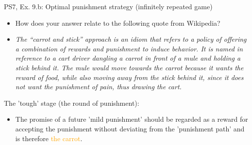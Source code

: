 \begin{frame}{PS7, Ex. 9.b: Optimal punishment strategy (infinitely repeated game)}
  \begin{itemize}
    \item[(b)] How does your answer relate to the following quote from Wikipedia?
    \item[] \textit{The “carrot and stick” approach is an idiom that refers to a policy of offering a combination of rewards and punishment to induce behavior. It is named in reference to a cart driver dangling a carrot in front of a mule and holding a stick behind it. The mule would move towards the carrot because it wants the reward of food, while also moving away from the stick behind it, since it does not want the punishment of pain, thus drawing the cart.}
  \end{itemize}
  \vspace{-4pt}
  \begin{multicols}{2}
    The 'tough' stage (the  round of punishment):
    \begin{itemize}
      \item The promise of a future 'mild punishment' should be regarded as a reward for accepting the punishment without deviating from the 'punishment path' and is therefore \textcolor{orange}{the carrot}.
    \end{itemize}
    \vfill\null\columnbreak
    \vfill\null
  \end{multicols}
\end{frame}
